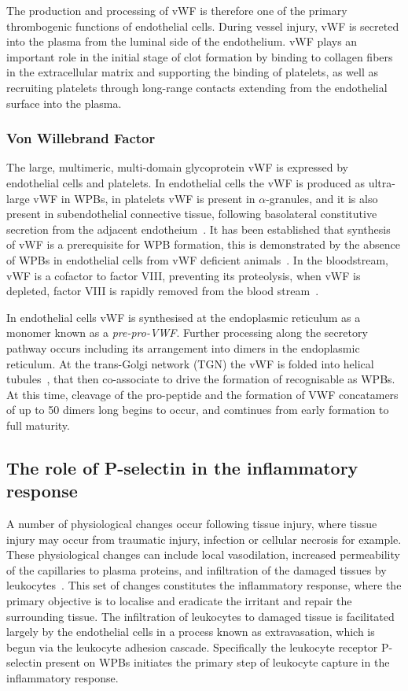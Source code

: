 The production and processing of vWF is therefore one of the primary thrombogenic functions of endothelial cells. During vessel injury, vWF is secreted into the plasma from the luminal side of the endothelium. vWF plays an important role in the initial stage of clot formation by binding to collagen fibers in the extracellular matrix and supporting the binding of platelets, as well as recruiting platelets through long-range contacts extending from the endothelial surface into the plasma.

\subsubsection{Von Willebrand Factor}
The large, multimeric, multi-domain glycoprotein vWF is expressed by endothelial cells and platelets. In endothelial cells the vWF is produced as ultra-large vWF in WPBs, in platelets vWF is present in $\alpha$-granules, and it is also present in  subendothelial connective tissue, following basolateral constitutive secretion from the adjacent endotheium~\cite{Sadler1998}. It has been established that synthesis of vWF is a prerequisite for WPB formation, this is demonstrated by the absence of WPBs in endothelial cells from vWF deficient animals~\cite{Serpe2008}. In the bloodstream, vWF is a cofactor to factor VIII, preventing its proteolysis, when vWF is depleted, factor VIII is rapidly removed from the blood stream~\cite{Sadler1998}.

In endothelial cells vWF is synthesised at the endoplasmic reticulum as a monomer known as a \emph{pre-pro-VWF}. Further processing along the secretory pathway occurs including its arrangement into dimers in the endoplasmic reticulum. At the trans-Golgi network (TGN) the vWF is folded into helical tubules~\cite{Ewenstein1987}, that then co-associate to drive the formation of recognisable as WPBs. At this time, cleavage of the pro-peptide and the formation of VWF concatamers of up to 50 dimers long begins to occur, and comtinues from early formation to full maturity.

\subsection{The role of P-selectin in the inflammatory response}
\label{introduction:endothelial_cellular_biology:p-selectin_inflammatory_cascade}
A number of physiological changes occur following tissue injury, where tissue injury may occur from traumatic injury, infection or cellular necrosis for example. These physiological changes can include local vasodilation, increased permeability of the capillaries to plasma proteins, and infiltration of the damaged tissues by leukocytes~\cite{Hall2011}. This set of changes constitutes the inflammatory response, where the primary objective is to localise and eradicate the irritant and repair the surrounding tissue. The infiltration of leukocytes to damaged tissue is facilitated largely by the endothelial cells in a process known as extravasation, which is begun via the leukocyte adhesion cascade. Specifically the leukocyte receptor P-selectin present on WPBs initiates the primary step of leukocyte capture in the inflammatory response.

